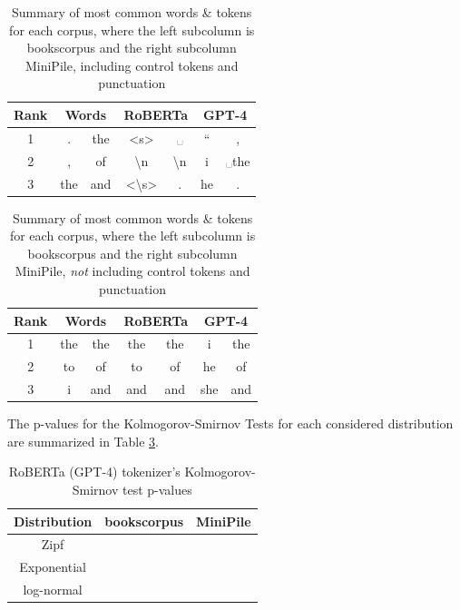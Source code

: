 \documentclass[11pt]{article}
\begin{document}
\begin{table}
    \centering
    \begin{tabular}{|c|c|c|c|c|c|c|}
        \hline
        \textbf{Rank} & \multicolumn{2}{c|}{\textbf{Words}} & \multicolumn{2}{c|}{\textbf{RoBERTa}} & \multicolumn{2}{c|}{\textbf{GPT-4}}  \\
        \hline
        1 & . & the & <s> & ␣ & `` & , \\
        \hline
        2 & , & of & \textbackslash n & \textbackslash n & i & ␣the \\
        \hline
        3 & the & and & <\textbackslash s> & . & he & . \\
        \hline
    \end{tabular}
    \caption{Summary of most common words \& tokens for each corpus, where the left subcolumn is bookscorpus and the right subcolumn MiniPile, including control tokens and punctuation}
    \label{tbl:token ranks}
\end{table}

\begin{table}
    \centering
    \begin{tabular}{|c|c|c|c|c|c|c|}
        \hline
        \textbf{Rank} & \multicolumn{2}{c|}{\textbf{Words}} & \multicolumn{2}{c|}{\textbf{RoBERTa}} & \multicolumn{2}{c|}{\textbf{GPT-4}}  \\
        \hline
        1 & the & the & the & the & i & the \\
        \hline
        2 & to & of & to & of & he & of \\
        \hline
        3 & i & and & and & and & she & and \\
        \hline
    \end{tabular}
    \caption{Summary of most common words \& tokens for each corpus, where the left subcolumn is bookscorpus and the right subcolumn MiniPile, \textit{not} including control tokens and punctuation}
    \label{tbl:token ranks no control}
\end{table}

The p-values for the Kolmogorov-Smirnov Tests for each considered distribution are summarized in Table \ref{tbl:pvals}.

\begin{table}
    \centering
    \begin{tabular}{|c|c|c|}
        \hline
        \textbf{Distribution} & \textbf{bookscorpus} & \textbf{MiniPile} \\
        \hline
        Zipf &  &  \\
        \hline
        Exponential &  &  \\
        \hline
        log-normal &  &  \\
        \hline
    \end{tabular}
    \caption{RoBERTa (GPT-4) tokenizer's Kolmogorov-Smirnov test p-values}
    \label{tbl:pvals}
\end{table}
\end{document}
